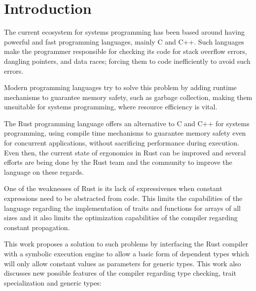 \chapter{Introduction}
\label{chap:introduction}
The current ecosystem for systems programming has been based around having
powerful and fast programming languages, mainly C and C++. Such languages make
the programmer responsible for  checking its code for stack overflow errors,
dangling pointers, and data races; forcing them to code inefficiently to avoid
such errors.

Modern programming languages try to solve this problem by adding runtime
mechanisms to guarantee memory safety, such as garbage collection, making them
unsuitable for systems programming, where resource efficiency is vital.

The Rust programming language offers an alternative to C and C++ for systems
programming, using compile time mechanisms to guarantee memory safety even for
concurrent applications, without sacrificing performance during execution. \\
Even then, the current state of ergonomics in Rust can be improved and several
efforts are being done by the Rust team and the community to improve the
language on these regards.

One of the weaknesses of Rust  is its lack of expressivenes when constant
expressions need to be abstracted from code. This limits the capabilities of
the language regarding the implementation of traits and functions for arrays of
all sizes and it also limits the optimization capabilities of the compiler
regarding constant propagation.

This work proposes a solution to such problems by interfacing the Rust compiler
with a symbolic execution engine to allow a basic form of dependent types which
will only allow constant values as parameters for generic types. This work also
discusses new possible features of the compiler regarding type checking, trait
specialization and generic types:

